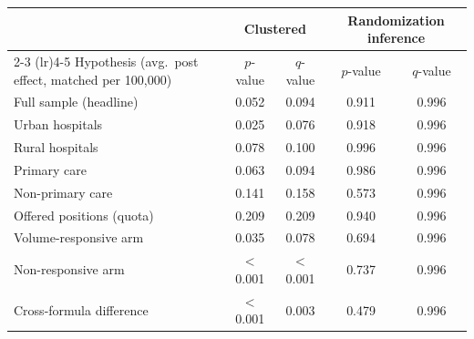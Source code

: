 \begin{tabular}{lcccc}
\toprule
 & \multicolumn{2}{c}{Clustered} & \multicolumn{2}{c}{Randomization inference} \\
\cmidrule(lr){2-3} \cmidrule(lr){4-5}
Hypothesis (avg.\ post effect, matched per 100{,}000) & $p$-value & $q$-value & $p$-value & $q$-value \\
\midrule
Full sample (headline) & 0.052 & 0.094 & 0.911 & 0.996 \\
Urban hospitals & 0.025 & 0.076 & 0.918 & 0.996 \\
Rural hospitals & 0.078 & 0.100 & 0.996 & 0.996 \\
Primary care & 0.063 & 0.094 & 0.986 & 0.996 \\
Non-primary care & 0.141 & 0.158 & 0.573 & 0.996 \\
Offered positions (quota) & 0.209 & 0.209 & 0.940 & 0.996 \\
Volume-responsive arm & 0.035 & 0.078 & 0.694 & 0.996 \\
Non-responsive arm & $<$0.001 & $<$0.001 & 0.737 & 0.996 \\
Cross-formula difference & $<$0.001 & 0.003 & 0.479 & 0.996 \\
\bottomrule
\end{tabular}
